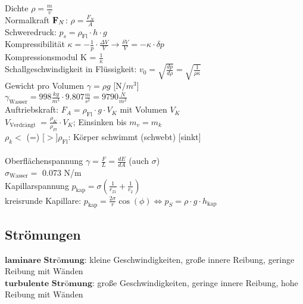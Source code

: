 \documentclass[fs, footer]{latex4ei}
\begin{document}
\begin{multicols*}{4}
Dichte $\rho = \frac{m}{v}$\\
Normalkraft $\textbf{F}_N$: $\rho = \frac{F_N}{A}$\\
Schweredruck: $p_s = \rho_{\text{Fl}}\cdot h\cdot g$\\
Kompressibilität $\kappa = -\frac{1}{p}\cdot \frac{\Delta V}{V} \rightarrow \frac{\delta V}{V}=-\kappa\cdot \delta p$\\
Kompressionsmodul K = $\frac{1}{\kappa}$\\
Schallgeschwindigkeit in Flüssigkeit: $v_0 = \sqrt{\frac{dp}{d\rho}} = \sqrt{\frac{1}{\rho\kappa}}$\\
Gewicht pro Volumen $\gamma = \rho g$ [N/$m^3$]\\
$\gamma_{\text{Wasser}} = 998\frac{kg}{m^3}\cdot 9.807\frac{m}{s^2} = 9790 \frac{N}{m^2}$\\
Auftriebskraft: $F_A = \rho_{\text{Fl}}\cdot g\cdot V_K$ mit Volumen $V_K$\\
$V_{\text{Verdrängt }} = \frac{\rho_K}{\rho_{Fl}}\cdot V_K$; Einsinken bis $m_v = m_k$\\
$\rho_k < $ (=) [$>$]$ \rho_{\text{Fl}}$: Körper schwimmt (schwebt) [sinkt]\\ %
\\
Oberflächenspannung $\gamma = \frac{F}{L} = \frac{dE}{dA}$ (auch $\sigma$)\\
$\sigma_{\text{Wasser}} =$ 0.073 N/m\\
Kapillarspannung $p_{\text{kap}} = \sigma(\frac{1}{r_21}+\frac{1}{r_2})$\\
kreisrunde Kapillare: $p_{\text{kap}} = \frac{2\sigma}{r}\cos (\phi) \Leftrightarrow p_S = \rho\cdot g\cdot h_{\text{kap}}$\\

\subsection{Strömungen}
$\textbf{laminare Strömung:}$ kleine Geschwindigkeiten, große innere Reibung, geringe Reibung mit Wänden\\
$\textbf{turbulente Strömung:}$ große Geschwindigkeiten, geringe innere Reibung, hohe Reibung mit Wänden\\


\end{multicols*}
\end{document}
